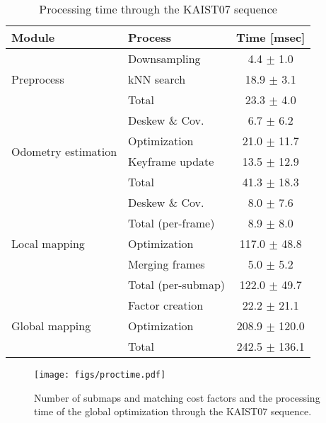 \documentclass[letterpaper, 10 pt, conference]{ieeeconf}  %
\begin{document}
\begin{table}[tb]
  \centering
  \caption{Processing time through the KAIST07 sequence}
  \label{tab:proctime_kaist}
  \begin{tabular}{llc}
  \toprule
  Module & Process & Time [msec] \\
  \midrule
  \midrule
  \multirow{3}{*}{Preprocess}
                      & Downsampling       & 4.4 $\pm$ 1.0  \\
                      & kNN search         & 18.9 $\pm$ 3.1 \\
                      & Total              & 23.3 $\pm$ 4.0 \\
  \midrule
  \multirow{4}{*}{Odometry estimation}
                      & Deskew \& Cov.     & 6.7 $\pm$ 6.2   \\
                      & Optimization       & 21.0 $\pm$ 11.7 \\
                      & Keyframe update    & 13.5 $\pm$ 12.9 \\
                      & Total              & 41.3 $\pm$ 18.3 \\
  \midrule
  \multirow{5}{*}{Local mapping}
                      & Deskew \& Cov.     & 8.0 $\pm$ 7.6    \\
                      & Total (per-frame)  & 8.9 $\pm$ 8.0    \\ \cmidrule{2-3}
                      & Optimization       & 117.0 $\pm$ 48.8 \\
                      & Merging frames     & 5.0 $\pm$ 5.2    \\
                      & Total (per-submap) & 122.0 $\pm$ 49.7 \\
  \midrule
  \multirow{3}{*}{Global mapping}
                      & Factor creation    & 22.2 $\pm$ 21.1   \\
                      & Optimization       & 208.9 $\pm$ 120.0 \\
                      & Total              & 242.5 $\pm$ 136.1 \\
  \bottomrule
  \end{tabular}
\end{table}

\begin{figure}[tb]
  \centering
  \texttt{[image: figs/proctime.pdf]}
  \caption{Number of submaps and matching cost factors and the processing time of the global optimization through the KAIST07 sequence.}
  \label{fig:proctime}
\end{figure}
\end{document}
